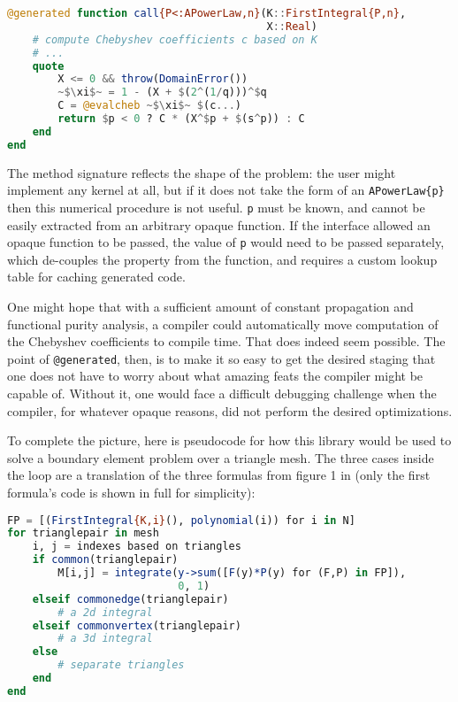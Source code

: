 \begin{singlespace}
\begin{lstlisting}[language=julia]
@generated function call{P<:APowerLaw,n}(K::FirstIntegral{P,n},
                                         X::Real)
    # compute Chebyshev coefficients c based on K
    # ...
    quote
        X <= 0 && throw(DomainError())
        ~$\xi$~ = 1 - (X + $(2^(1/q)))^$q
        C = @evalcheb ~$\xi$~ $(c...)
        return $p < 0 ? C * (X^$p + $(s^p)) : C
    end
end
\end{lstlisting}
\end{singlespace}

The method signature reflects the shape of the problem: the user might
implement any kernel at all, but if it does not take the form of an
\texttt{APowerLaw\{p\}} then this numerical procedure is not useful.
\texttt{p} must be known, and cannot be easily extracted from an arbitrary
opaque function.
If the interface allowed an opaque function to be passed, the value of
\texttt{p} would need to be passed separately, which de-couples the
property from the function, and requires a custom lookup table for caching
generated code.

One might hope that with a sufficient amount of constant propagation and
functional purity analysis, a compiler could automatically move
computation of the Chebyshev coefficients to compile time.
That does indeed seem possible.
The point of \texttt{@generated}, then, is to make it so easy to
get the desired staging that one does not have to worry
about what amazing feats the compiler might be capable of.
Without it, one would face a difficult debugging challenge when the
compiler, for whatever opaque reasons, did not perform the desired
optimizations.

To complete the picture, here is pseudocode for how this library would be
used to solve a boundary element problem over a triangle mesh.
The three cases inside the loop are a translation of the three formulas
from figure 1 in \cite{ReidWhJo14} (only the first formula's code is shown in
full for simplicity):

\begin{singlespace}
\begin{lstlisting}[language=julia]
FP = [(FirstIntegral{K,i}(), polynomial(i)) for i in N]
for trianglepair in mesh
    i, j = indexes based on triangles
    if common(trianglepair)
        M[i,j] = integrate(y->sum([F(y)*P(y) for (F,P) in FP]),
                           0, 1)
    elseif commonedge(trianglepair)
        # a 2d integral
    elseif commonvertex(trianglepair)
        # a 3d integral
    else
        # separate triangles
    end
end
\end{lstlisting}
\end{singlespace}

